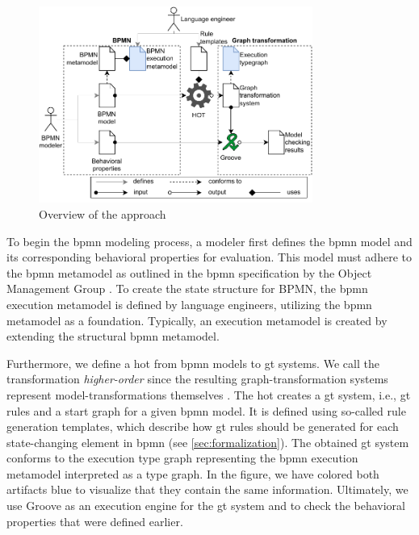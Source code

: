 \documentclass[runningheads]{llncs}
\begin{document}
\begin{figure}[ht]
    \centering
    \includegraphics[width=0.8\textwidth]{images/bpmn_semantics-overview.pdf}
    \caption{Overview of the approach}
    \label{fig:approach}
\end{figure}

%
To begin the \gls*{bpmn} modeling process, a modeler first defines the \gls*{bpmn} model and its corresponding behavioral properties for evaluation.
This model must adhere to the \gls*{bpmn} metamodel as outlined in the \gls*{bpmn} specification by the Object Management Group \cite{objectmanagementgroupBusinessProcessModel2013}.
To create the state structure for BPMN, the \gls*{bpmn} execution metamodel is defined by language engineers, utilizing the \gls*{bpmn} metamodel as a foundation.
Typically, an execution metamodel is created by extending the structural \gls*{bpmn} metamodel.

Furthermore, we define a \gls*{hot} from \gls*{bpmn} models to \gls*{gt} systems.
We call the transformation \textit{higher-order} since the resulting graph-transformation systems represent model-transformations themselves \cite{tisiUseHigherOrderModel2009}.
The \gls*{hot} creates a \gls*{gt} system, i.e., \gls*{gt} rules and a start graph for a given \gls*{bpmn} model.
It is defined using so-called rule generation templates, which describe how \gls*{gt} rules should be generated for each state-changing element in \gls*{bpmn} (see \autoref{sec:formalization}).
The obtained \gls*{gt} system conforms to the execution type graph representing the \gls*{bpmn} execution metamodel interpreted as a type graph.
In the figure, we have colored both artifacts blue to visualize that they contain the same information.
Ultimately, we use Groove as an execution engine for the \gls*{gt} system and to check the behavioral properties that were defined earlier.
\end{document}
